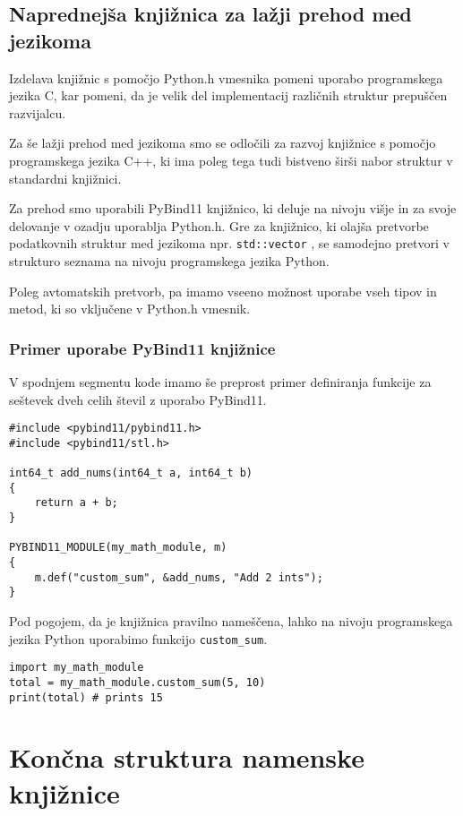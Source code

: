 \documentclass[a4paper,12pt,openright]{book}
\begin{document}
    \subsection{Naprednejša knjižnica za lažji prehod med jezikoma}

    Izdelava knjižnic s pomočjo Python.h vmesnika pomeni uporabo programskega jezika C, kar pomeni, da je velik del implementacij različnih struktur prepuščen razvijalcu.
    
    Za še lažji prehod med jezikoma smo se odločili za razvoj knjižnice s pomočjo programskega jezika C++, ki ima poleg tega tudi bistveno širši nabor struktur v standardni knjižnici. 

    Za prehod smo uporabili PyBind11 \cite{PYBIND11_GITHUB} knjižnico, ki deluje na nivoju višje in za svoje delovanje v ozadju uporablja Python.h. Gre za knjižnico, ki olajša pretvorbe podatkovnih struktur med jezikoma npr. {\tt std::vector} \cite{CPP_VECTOR}, se samodejno pretvori v strukturo seznama na nivoju programskega jezika Python.

    Poleg avtomatskih pretvorb, pa imamo vseeno možnost uporabe vseh tipov in metod, ki so vključene v Python.h vmesnik.

    \subsubsection{Primer uporabe PyBind11 knjižnice}
    V spodnjem segmentu kode imamo še preprost primer definiranja funkcije za seštevek dveh celih števil z uporabo PyBind11.
\begin{verbatim}
#include <pybind11/pybind11.h>
#include <pybind11/stl.h>

int64_t add_nums(int64_t a, int64_t b)
{
    return a + b;
}

PYBIND11_MODULE(my_math_module, m)
{
    m.def("custom_sum", &add_nums, "Add 2 ints");
}
\end{verbatim}

    \noindent
    Pod pogojem, da je knjižnica pravilno nameščena, lahko na nivoju programskega jezika Python uporabimo funkcijo {\tt custom\_sum}.
\begin{verbatim}
import my_math_module
total = my_math_module.custom_sum(5, 10)
print(total) # prints 15
\end{verbatim}

    \newpage
    \section{Končna struktura namenske knjižnice}
\end{document}
